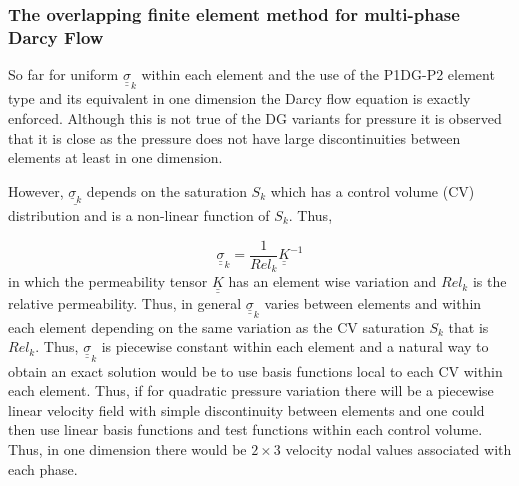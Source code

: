 \subsubsection{The overlapping finite element method for multi-phase Darcy Flow}

So far for uniform ${\underline{\underline \sigma}}_k$ within each element and the use of the P1DG-P2 element type
and its equivalent in one dimension the Darcy flow equation is
exactly enforced. Although this is not true of the DG variants
for pressure it is observed that it is close
as the pressure does not have large discontinuities
between elements at least in one dimension.

However, ${\underline{\underline \sigma_k}}$ depends on the saturation $S_k$ which has
a control volume (CV) distribution and is a non-linear function of $S_k$.
Thus,

\begin{equation}
{\underline {\underline \sigma}}_k
= \frac{1}{{Rel}_k} {\underline{\underline K}}^{-1}
\end{equation}
in which the permeability tensor
${\underline{\underline K}}$ has an element wise variation
and ${Rel}_k$ is the relative permeability.
Thus, in general ${\underline {\underline \sigma}}_k$ varies between elements and within each element
depending on the same variation as the CV saturation $S_k$ that is $Rel_k$.
Thus, ${\underline {\underline \sigma}}_k$ is piecewise constant
within each element and a natural
way to obtain an exact solution would be to use basis functions
local to each CV within each element.
Thus, if for quadratic pressure variation there will be
a piecewise
linear velocity field with simple discontinuity between
elements and one could then use linear basis functions
and test functions within each control volume. Thus, in one dimension
there would be $2\times 3$ velocity nodal values associated with
each phase.

